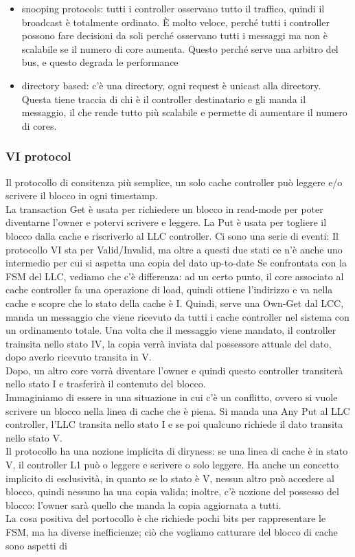 \documentclass[12pt, oneside]{extbook} %
\begin{document}
\begin{itemize}
\item snooping protocols: tutti i controller osservano tutto il traffico, quindi il broadcast è totalmente ordinato. È molto veloce, perché tutti i controller possono fare decisioni da soli perché osservano tutti i messaggi ma non è scalabile se il numero di core aumenta. Questo perché serve una arbitro del bus, e questo degrada le performance
\item directory based: c'è una directory, ogni request è unicast alla directory. Questa tiene traccia di chi è il controller destinatario e gli manda il messaggio, il che rende tutto più scalabile e permette di aumentare il numero di cores.
\end{itemize}
\subsubsection{VI protocol}
Il protocollo di consitenza più semplice, un solo cache controller può leggere e/o scrivere il blocco in ogni timestamp.\\ La transaction Get è usata per richiedere un blocco in read-mode per poter diventarne l'owner e potervi scrivere e leggere. La Put è usata per togliere il blocco dalla cache e riscriverlo al LLC controller. Ci sono una serie di eventi:
Il protocollo VI sta per Valid/Invalid, ma oltre a questi due stati ce n'è anche uno intermedio per cui si aspetta una copia del dato up-to-date
Se confrontata con la FSM del LLC, vediamo che c'è differenza: ad un certo punto, il core associato al cache controller fa una operazione di load, quindi ottiene l'indirizzo e va nella cache e scopre che lo stato della cache è I. Quindi, serve una Own-Get dal LCC, manda un messaggio che viene ricevuto da tutti i cache controller nel sistema con un ordinamento totale. Una volta che il messaggio viene mandato, il controller trainsita nello stato IV, la copia verrà inviata dal possessore attuale del dato, dopo averlo ricevuto transita in V. \\ Dopo, un altro core vorrà diventare l'owner e quindi questo controller transiterà nello stato I e trasferirà il contenuto del blocco.\\ Immaginiamo di essere in una situazione in cui c'è un conflitto, ovvero si vuole scrivere un blocco nella linea di cache che è piena. Si manda una Any Put al LLC controller, l'LLC transita nello stato I e se poi qualcuno richiede il dato transita nello stato V.\\ Il protocollo ha una nozione implicita di diryness: se una linea di cache è in stato V, il controller L1 può o leggere e scrivere o solo leggere. Ha anche un concetto implicito di esclusività, in quanto se lo stato è V, nessun altro può accedere al blocco, quindi nessuno ha una copia valida; inoltre, c'è nozione del possesso del blocco: l'owner sarà quello che manda la copia aggiornata a tutti.\\ La cosa positiva del portocollo è che richiede pochi bits per rappresentare le FSM, ma ha diverse inefficienze; ciò che vogliamo catturare del blocco di cache sono aspetti di
\end{document}

